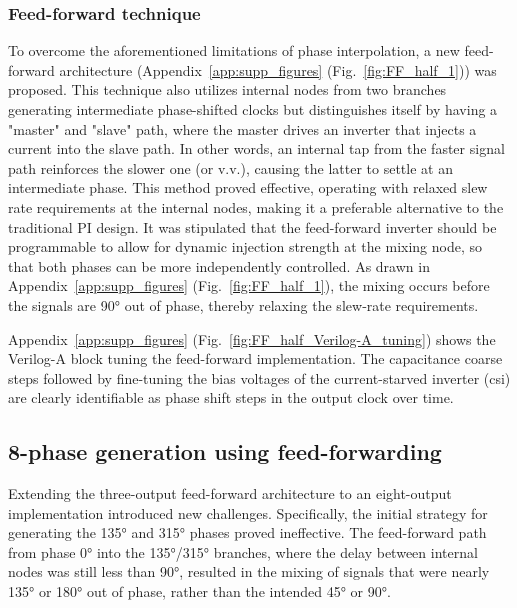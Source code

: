 \subsubsection{Feed-forward technique}\label{sec:feedforward}
To overcome the aforementioned limitations of phase interpolation, a new feed-forward architecture (Appendix~\ref{app:supp_figures} (Fig.~\ref{fig:FF_half_1})) was proposed. This technique also utilizes internal nodes from two branches generating intermediate phase-shifted clocks but distinguishes itself by having a "master" and "slave" path, where the master drives an inverter that injects a current into the slave path. In other words, an internal tap from the faster signal path reinforces the slower one (or v.v.), causing the latter to settle at an intermediate phase. This method proved effective, operating with relaxed slew rate requirements at the internal nodes, making it a preferable alternative to the traditional PI design. It was stipulated that the feed-forward inverter should be programmable to allow for dynamic injection strength at the mixing node, so that both phases can be more independently controlled. As drawn in Appendix~\ref{app:supp_figures} (Fig.~\ref{fig:FF_half_1}), the mixing occurs before the signals are \ang{90} out of phase, thereby relaxing the slew‑rate requirements.


Appendix~\ref{app:supp_figures} (Fig.~\ref{fig:FF_half_Verilog-A_tuning}) shows the Verilog-A block tuning the feed-forward implementation. The capacitance coarse steps followed by fine-tuning the bias voltages of the current-starved inverter (\gls{csi}) are clearly identifiable as phase shift steps in the output clock over time.


\subsection{8-phase generation using feed-forwarding}\label{sec:8phase_FF}

Extending the three-output feed-forward architecture to an eight-output implementation introduced new challenges. Specifically, the initial strategy for generating the \ang{135} and \ang{315} phases proved ineffective. The feed-forward path from phase \ang{0} into the \ang{135}/\ang{315} branches, where the delay between internal nodes was still less than \ang{90}, resulted in the mixing of signals that were nearly \ang{135} or \ang{180} out of phase, rather than the intended \ang{45} or \ang{90}.

